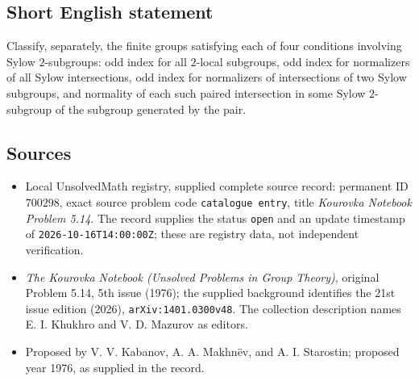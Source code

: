 \documentclass[11pt]{article}
\begin{document}
\subsection{Short English statement}
Classify, separately, the finite groups satisfying each of four conditions involving Sylow \(2\)-subgroups: odd index for all \(2\)-local subgroups, odd index for normalizers of all Sylow intersections, odd index for normalizers of intersections of two Sylow subgroups, and normality of each such paired intersection in some Sylow \(2\)-subgroup of the subgroup generated by the pair.
\subsection{Sources}
\begin{itemize}
\item Local UnsolvedMath registry, supplied complete source record: permanent ID \(700298\), exact source problem code \texttt{catalogue entry}, title \emph{Kourovka Notebook Problem 5.14}. The record supplies the status \texttt{open} and an update timestamp of \texttt{2026-10-16T14:00:00Z}; these are registry data, not independent verification.
\item \emph{The Kourovka Notebook (Unsolved Problems in Group Theory)}, original Problem 5.14, 5th issue (1976); the supplied background identifies the 21st issue edition (2026), \texttt{arXiv:1401.0300v48}. The collection description names E. I. Khukhro and V. D. Mazurov as editors.
\item Proposed by V. V. Kabanov, A. A. Makhn\"ev, and A. I. Starostin; proposed year 1976, as supplied in the record.
\end{itemize}
\end{document}
